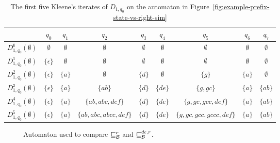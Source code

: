 \begin{table}[h]
\centering
\begin{tabular}{ c | c | c | c | c | c | c | c | c}
 & $q_0$ & $q_1$ & $q_2$ & $q_3$ & $q_4$ & $q_5$ & $q_6$ & $q_7$\\
\hline
$D_{1,q_0}^0(\emptyset)$ & $\emptyset$ & $\emptyset$ & $\emptyset$ & $\emptyset$ & $\emptyset$ & $\emptyset$ & $\emptyset$ & $\emptyset$\\
$D_{1,q_0}^1(\emptyset)$ & $\{ \epsilon \}$ & $\emptyset$ & $\emptyset$ & $\emptyset$ & $\emptyset$ & $\emptyset$ & $\emptyset$ & $\emptyset$\\
$D_{1,q_0}^2(\emptyset)$ & $\{ \epsilon \}$ & $\{a\}$ & $\emptyset$ & $\{d\}$ & $\emptyset$ & $\{g\}$ & $\{a\}$ & $\emptyset$\\
$D_{1,q_0}^3(\emptyset)$ & $\{ \epsilon \}$ & $\{a\}$ & $\{ab\}$ & $\{d\}$ & $\{de\}$ & $\{g, gc\}$ & $\{a\}$ & $\{ab\}$\\
$D_{1,q_0}^4(\emptyset)$ & $\{ \epsilon \}$ & $\{a\}$ & $\{ab, abc, def\}$ & $\{d\}$ & $\{de\}$ & $\{g, gc, gcc, def\}$ & $\{a\}$ & $\{ab\}$\\
$D_{1,q_0}^5(\emptyset)$ & $\{ \epsilon \}$ & $\{a\}$ & $\{ab, abc, abcc, def\}$ & $\{d\}$ & $\{de\}$ & $\{g, gc, gcc, gccc, def\}$ & $\{a\}$ & $\{ab\}$\\
\end{tabular}
\caption{The first five Kleene's iterates of $D_{1,q_0}$ on the automaton in
Figure~\ref{fig:example-prefix-state-vs-right-sim}}
\label{table:D_1-example1}
\end{table}

\begin{figure}[h]
\centering
{}
\caption{Automaton used to compare $\sqsubseteq_{\mathcal{B}}^r$ and $\sqsubseteq_{\mathcal{B}}^{de,r}$.}
\label{fig:example-prefix-right-sim-vs-right-del-sim}
\end{figure}

